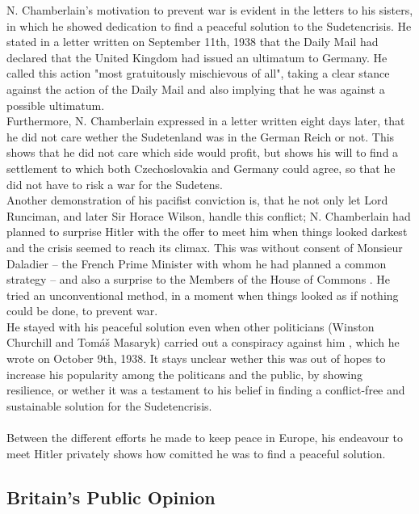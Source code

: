 \documentclass[10pt, a4papert, hidelinks]{article}
\begin{document}
N. Chamberlain's motivation to prevent war is evident in the letters to his sisters, in which he showed dedication to find a peaceful solution to the Sudetencrisis. He stated in a letter written on September 11th, 1938 that the Daily Mail had declared that the United Kingdom had issued an ultimatum to Germany. He called this action "most gratuitously mischievous of all", taking a clear stance against the action of the Daily Mail and also implying that he was against a possible ultimatum.\\
Furthermore, N. Chamberlain expressed in a letter written eight days later, that he did not care wether the Sudetenland was in the German Reich or not. This shows that he did not care which side would profit, but shows his will to find a settlement to which both Czechoslovakia and Germany could agree, so that he did not have to risk a war for the Sudetens.\\
Another demonstration of his pacifist conviction is, that he not only let Lord Runciman, and later Sir Horace Wilson, handle this conflict; N. Chamberlain had planned to surprise Hitler with the offer to meet him when things looked darkest and the crisis seemed to reach its climax. This was without consent of Monsieur Daladier -- the French Prime Minister with whom he had planned a common strategy -- and also a surprise to the Members of the House of Commons \cite{voelkerbund_muenchener_abkommen_hermann_raschhofer}. He tried an unconventional method, in a moment when things looked as if nothing could be done, to prevent war.\\
He stayed with his peaceful solution even when other politicians (Winston Churchill and Tomáš Masaryk) carried out a conspiracy against him \cite{chamberlain_neville_2000}, which he wrote on October 9th, 1938. It stays unclear wether this was out of hopes to increase his popularity among the politicans and the public, by showing resilience, or wether it was a testament to his belief in finding a conflict-free and sustainable solution for the Sudetencrisis.\\\\
Between the different efforts he made to keep peace in Europe, his endeavour to meet Hitler privately shows how comitted he was to find a peaceful solution.

\subsection{Britain's Public Opinion} %
\end{document}
